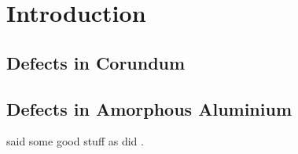 \chapter{Introduction}

\section{Defects in Corundum}
\section{Defects in Amorphous Aluminium}

\citeauthor{Momida2011} said some good stuff \cite{Momida2011,Mathews2004} as did \citeauthor{Mathews2004}.  